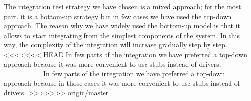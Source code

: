 The integration test strategy we have chosen is a mixed approach; for the most part, it is a bottom-up strategy but in few cases we have used the top-down approach. 
\newline 
The reason why we have widely used the bottom-up model is that it allows to start integrating from the simplest components of the system. In this way, the complexity of the integration will increase gradually step by step.
<<<<<<< HEAD
In few parts of the integration we have preferred a top-down approach because it was more convenient to use stubs instead of drivers.
=======
In few parts of the integration we have preferred a top-down approach because in those cases it was more convenient to use stubs instead of drivers.
>>>>>>> origin/master
